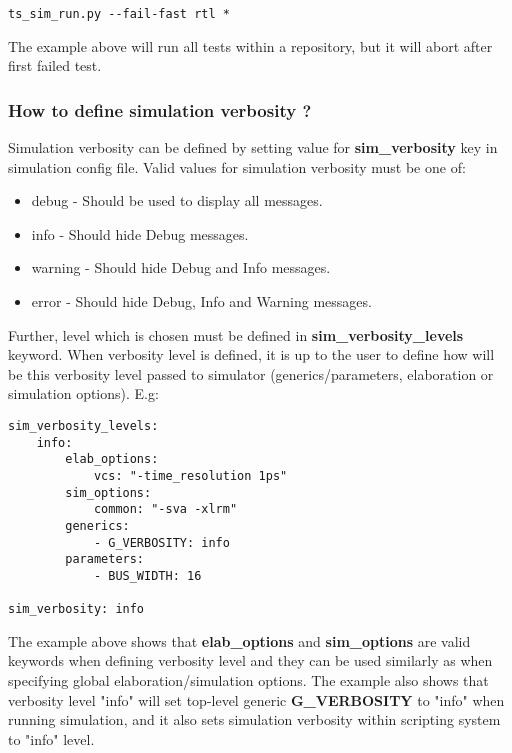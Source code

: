 \documentclass{tropic_design_spec}
\begin{document}
\begin{lstlisting}
ts_sim_run.py --fail-fast rtl *
\end{lstlisting}

The example above will run all tests within a repository, but it will abort after first
failed test.


\subsubsection{How to define simulation verbosity ?}
\label{sec:how-to-define-simulation-verbosity}

Simulation verbosity can be defined by setting value for \textbf{sim_verbosity} key in
simulation config file. Valid values for simulation verbosity must be one of:

\begin{itemize}
    \item{debug - Should be used to display all messages.}
    \item{info - Should hide Debug messages.}
    \item{warning - Should hide Debug and Info messages.}
    \item{error - Should hide Debug, Info and Warning messages.}
\end{itemize}

Further, level which is chosen must be defined in \textbf{sim_verbosity_levels} keyword.
When verbosity level is defined, it is up to the user to define how will be this verbosity
level passed to simulator (generics/parameters, elaboration or simulation options). E.g:

\begin{lstlisting}
sim_verbosity_levels:
    info:
        elab_options:
            vcs: "-time_resolution 1ps"
        sim_options:
            common: "-sva -xlrm"
        generics:
            - G_VERBOSITY: info
        parameters:
            - BUS_WIDTH: 16

sim_verbosity: info
\end{lstlisting}

The example above shows that \textbf{elab_options} and \textbf{sim_options} are valid
keywords when defining verbosity level and they can be used similarly as
when specifying global elaboration/simulation options.
The example also shows that verbosity level "info" will set top-level generic
\textbf{G_VERBOSITY} to "info" when running simulation, and it also sets simulation
verbosity within scripting system to "info" level.
\end{document}
